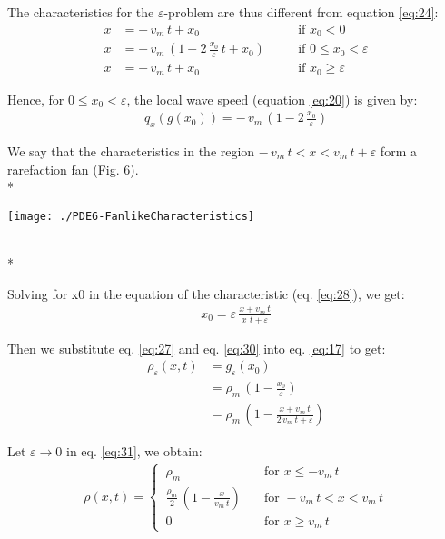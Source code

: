 \documentclass[../main.tex]{subfiles}
\begin{document}
The characteristics for the $\varepsilon$-problem are thus different from equation \ref{eq:24}:
\begin{align} \label{eq:28}
    x &= - \, v_m \, t + x_0 \quad & & \text{if } x_0 < 0 \nonumber \\
    x &= - \, v_m \, \left(1 - 2 \, \frac{x_0}{\varepsilon} \, t + x_0\right) \quad & & \text{if } 0 \leqslant x_0 < \varepsilon \\
    x &= - \, v_m \, t + x_0 \quad & & \text{if } x_0 \geqslant \varepsilon \nonumber
\end{align}

Hence, for $0 \leqslant x_0 < \varepsilon$, the local wave speed (equation \ref{eq:20}) is given by:
\begin{align} \label{eq:29}
    q_x(g(x_0)) = - \, v_m \, \left(1 - 2 \, \frac{x_0}{\varepsilon} \right)
\end{align}

We say that the characteristics in the region $− \, v_m \, t < x < v_m \, t + \varepsilon$ form a rarefaction fan (Fig. 6).
\\*

\begin{wrapfigure}{\linewidth} \label{fig:6}
\centering
\texttt{[image: ./PDE6-FanlikeCharacteristics]}
    \begin{center}
    \end{center}
\end{wrapfigure}
\\*

Solving for x0 in the equation of the characteristic (eq. \ref{eq:28}), we get:
\begin{align} \label{eq:30}
    x_0 = \varepsilon \, \frac{x + v_m \, t}{x \, \, t + \varepsilon}
\end{align}

Then we substitute eq. \ref{eq:27} and eq. \ref{eq:30} into eq. \ref{eq:17} to get:
\begin{align} \label{eq:31}
    \rho_{\varepsilon}(x,t) &= g_{\varepsilon}(x_0) \nonumber \\
                            &= \rho_m \, \left(1 - \frac{x_0}{\varepsilon}\right) \nonumber \\
                            &= \rho_m \, \left(1 - \frac{x + v_m \, t}{2 \, v_m \, t + \varepsilon}\right)
\end{align}

Let $\varepsilon \to 0$ in eq. \ref{eq:31}, we obtain:
\begin{align}
    \rho(x,t) = \begin{cases} \label{eq:32}
                \, \rho_m \quad & \text{for } x \leqslant -v_m \, t \\
                \, \frac{\rho_m}{2} \, \left(1 - \frac{x}{v_m \, t} \right) \quad & \text{for } -v_m \, t < x < v_m \, t \\
                \, 0 \quad & \text{for } x \geqslant v_m \, t
                \end{cases}
\end{align}
\end{document}
